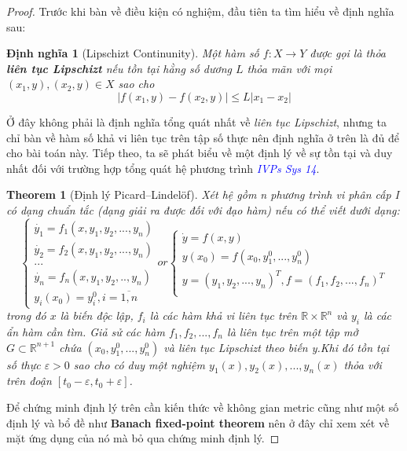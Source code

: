 \documentclass[a4paper]{article}
\newtheorem{definition}{Định nghĩa}
\newtheorem{theorem}{{\bf Theorem}}
\begin{document}
\begin{proof}
    Trước khi bàn về điều kiện có nghiệm, đầu tiên ta tìm hiểu về định nghĩa sau: 
    \begin{definition}[Lipschizt Continunity]
        Một hàm số $f:X\to Y$ được gọi là thỏa \textbf{liên tục Lipschizt} nếu tồn tại hằng số dương $L$ thỏa mãn với mọi $(x_1, y),(x_2, y)\in X$ sao cho  
$$\left|f(x_1, y)-f(x_2, y)\right|\le L|x_1-x_2|$$
    \end{definition}
Ở đây không phải là định nghĩa tổng quát nhất về \textit{liên tục Lipschizt}, nhưng ta chỉ bàn về hàm số khả vi liên tục trên tập số thực nên định nghĩa ở trên là đủ để cho bài toán này.
\newline
Tiếp theo, ta sẽ phát biểu về một định lý về sự tồn tại và duy nhất đối với trường hợp tổng quát hệ phương trình \textit{\textcolor{blue}{IVPs Sys 14}}.
\begin{theorem}[Định lý Picard–Lindelöf]
Xét hệ gồm n phương trình vi phân cấp I có dạng \textit{chuẩn tắc} (dạng giải ra được đối với đạo hàm) nếu có thể viết dưới dạng: 
$$
\begin{cases}
    \dot{y_1} = f_1(x, y_1, y_2,..., y_n)\\
    \dot{y_2} = f_2(x, y_1, y_2,...,y_n)\\
    ... \\
    \dot{y_n} = f_n(x, y_1, y_2,..,y_n) \\
    y_i(x_0) = y_i^0, i = \overline{1,n}
\end{cases} or \begin{cases}
    \dot{y} = f(x,y) \\
    y(x_0) = f(x_0,y_1^0,...,y_n^0) \\
    y = (y_1, y_2,..., y_n)^T, f = (f_1, f_2,..., f_n)^T \\
\end{cases}$$
trong đó $x$ là biến độc lập, $f_i$ là các hàm khả vi liên tục trên $\mathbb{R} \times \mathbb{R}^n$ và $y_i$ là các ẩn hàm cần tìm.
\newline
Giả sử các hàm $f_1, f_2,..., f_n$ là liên tục trên một tập mở $G \subset \mathbb{R}^{n+1}$ chứa $(x_0, y_1^0,...,y_n^0)$ và \textit{liên tục Lipschizt} theo biến y.Khi đó tồn tại số thực $\varepsilon >0$ sao cho  có duy một nghiệm $y_1(x), y_2(x),..., y_n(x)$ thỏa với trên đoận $[t_0-\varepsilon,t_0+\varepsilon]$. 
\end{theorem}
Để chứng minh định lý trên cần kiến thức về không gian metric cũng như một số định lý và bổ đề như \textbf{Banach fixed-point theorem} nên ở đây chỉ xem xét về mặt ứng dụng của nó mà bỏ qua chứng minh định lý.

\end{proof}
\end{document}
